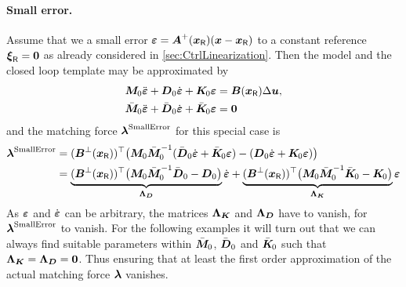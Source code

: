 \paragraph{Small error.}
Assume that we a small error $\boldsymbol{\varepsilon} = \boldsymbol{A}^+(\boldsymbol{x}_{\mathsf{R}})(\boldsymbol{x}-\boldsymbol{x}_{\mathsf{R}})$ to a constant reference $\boldsymbol{\xi}_{\mathsf{R}}=\boldsymbol{0}$ as already considered in \autoref{sec:CtrlLinearization}.
Then the model and the closed loop template may be approximated by
\begin{subequations}
\begin{align}
 \boldsymbol{M}_{\!\text{0}} \ddot{\boldsymbol{\varepsilon}} + \boldsymbol{D}_{\text{0}} \dot{\boldsymbol{\varepsilon}} + \boldsymbol{K}_{\!\text{0}} \boldsymbol{\varepsilon} &= \boldsymbol{B}(\boldsymbol{x}_{\mathsf{R}}) \Delta \boldsymbol{u},
\\
 \bar{\boldsymbol{M}}_{\!\text{0}} \ddot{\boldsymbol{\varepsilon}} + \bar{\boldsymbol{D}}_{\text{0}} \dot{\boldsymbol{\varepsilon}} + \bar{\boldsymbol{K}}_{\!\text{0}} \boldsymbol{\varepsilon} &= \boldsymbol{0}
\end{align}
\end{subequations}
and the matching force $\boldsymbol{\lambda}^{\text{SmallError}}$ for this special case is
\begin{align}\label{eq:MatchingForceLin}
 \tuple{\lambda}^{\text{SmallError}} &= (\sysInputMatLComp(\sysCoordR))^\top \big( \sysInertiaMatLin \sysInertiaMatCLin^{-1} (\sysDissMatCLin \LinErrorCoordd + \sysStiffMatCLin \LinErrorCoord) - (\sysDissMatLin \LinErrorCoordd + \sysStiffMatLin \LinErrorCoord) \big)
\nonumber\\
 &= \underbrace{(\sysInputMatLComp(\sysCoordR))^\top \big( \sysInertiaMatLin \sysInertiaMatCLin^{-1} \sysDissMatCLin - \sysDissMatLin\big)}_{\mat{\Lambda}_{\sysDissMat}} \LinErrorCoordd
  + \underbrace{(\sysInputMatLComp(\sysCoordR))^\top \big( \sysInertiaMatLin \sysInertiaMatCLin^{-1} \sysStiffMatCLin - \sysStiffMatLin\big)}_{\mat{\Lambda}_{\sysStiffMat}} \LinErrorCoord
\end{align}
As $\boldsymbol{\varepsilon}$ and $\dot{\boldsymbol{\varepsilon}}$ can be arbitrary, the matrices $\boldsymbol{\Lambda}_{\boldsymbol{K}}$ and $\boldsymbol{\Lambda}_{\boldsymbol{D}}$ have to vanish, for $\boldsymbol{\lambda}^{\text{SmallError}}$ to vanish.
For the following examples it will turn out that we can always find suitable parameters within $\bar{\boldsymbol{M}}_{\!\text{0}}$, $\bar{\boldsymbol{D}}_{\text{0}}$ and $\bar{\boldsymbol{K}}_{\!\text{0}}$ such that $\boldsymbol{\Lambda}_{\boldsymbol{K}} = \boldsymbol{\Lambda}_{\boldsymbol{D}} = \boldsymbol{0}$.
Thus ensuring that at least the first order approximation of the actual matching force $\boldsymbol{\lambda}$ vanishes.



